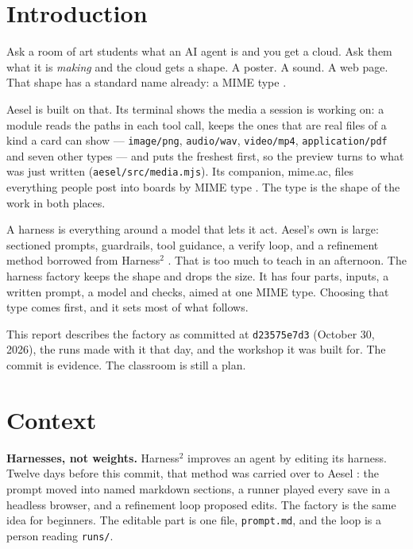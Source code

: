 \documentclass[10pt,letterpaper,twocolumn]{article}
\newcommand{\code}[1]{\texttt{#1}}
\begin{document}
\section{Introduction}
\label{sec:intro}

Ask a room of art students what an AI agent is and you get a cloud. Ask them
what it is \emph{making} and the cloud gets a shape. A poster. A sound. A
web page. That shape has a standard name already: a MIME type
\citep{rfc2045,rfc2046}.

Aesel is built on that. Its terminal shows the media a session is working
on: a module reads the paths in each tool call, keeps the ones that are real
files of a kind a card can show --- \code{image/png}, \code{audio/wav},
\code{video/mp4}, \code{application/pdf} and seven other types --- and puts the
freshest first, so the preview turns to what was just written
(\code{aesel/src/media.mjs}). Its companion, mime.ac, files everything
people post into boards by MIME type \citep{mimedoc}. The type is the shape of
the work in both places.

A harness is everything around a model that lets it act. Aesel's own is
large: sectioned prompts, guardrails, tool guidance, a verify loop, and a
refinement method borrowed from Harness$^2$ \citep{xu2026harness2,scudder2026harnessloop}.
That is too much to teach in an afternoon. The harness factory keeps the
shape and drops the size. It has four parts, inputs, a written prompt, a model
and checks, aimed at one MIME type. Choosing that type comes first, and it
sets most of what follows.

This report describes the factory as committed at \code{d23575e7d3}
(October 30, 2026), the runs made with it that day, and the workshop it was
built for. The commit is evidence. The classroom is still a plan.

\section{Context}
\label{sec:context}

\textbf{Harnesses, not weights.} Harness$^2$ \citep{xu2026harness2}
improves an agent by editing its harness. Twelve days before this commit,
that method was carried over to Aesel \citep{scudder2026harnessloop,aeselharnessdoc}:
the prompt moved into named markdown sections, a runner played every save in
a headless browser, and a refinement loop proposed edits. The factory is the
same idea for beginners. The editable part is one file, \code{prompt.md},
and the loop is a person reading \code{runs/}.
\end{document}

